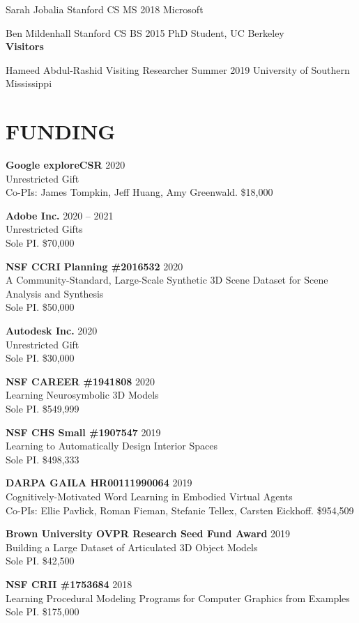 \documentclass[line,margin]{res}
\begin{document}
\begin{resume}
\alumni
{Sarah Jobalia}
{Stanford CS MS}
{2018}
{Microsoft}

\alumni
{Ben Mildenhall}
{Stanford CS BS}
{2015}
{PhD Student, UC Berkeley}
\\


\textbf{Visitors}

\visitor
{Hameed Abdul-Rashid}
{Visiting Researcher}
{Summer 2019}
{University of Southern Mississippi}


\section{FUNDING}

\newcommand{\funding}[5] {
	\textbf{#1} \hfill #5\\
	#2 \\
	#3. #4
}

\funding
{Google exploreCSR}
{Unrestricted Gift}
{Co-PIs: James Tompkin, Jeff Huang, Amy Greenwald}
{\$18,000}
{2020}

\funding
{Adobe Inc.}
{Unrestricted Gifts}
{Sole PI}
{\$70,000}
{2020 -- 2021}

\funding
{NSF CCRI Planning \#2016532}
{A Community-Standard, Large-Scale Synthetic 3D Scene Dataset for Scene Analysis and Synthesis}
{Sole PI}
{\$50,000}
{2020}

\funding
{Autodesk Inc.}
{Unrestricted Gift}
{Sole PI}
{\$30,000}
{2020}

\funding
{NSF CAREER \#1941808}
{Learning Neurosymbolic 3D Models}
{Sole PI}
{\$549,999}
{2020}

\funding
{NSF CHS Small \#1907547}
{Learning to Automatically Design Interior Spaces}
{Sole PI}
{\$498,333}
{2019}

\funding
{DARPA GAILA HR00111990064}
{Cognitively-Motivated Word Learning in Embodied Virtual Agents}
{Co-PIs: Ellie Pavlick, Roman Fieman, Stefanie Tellex, Carsten Eickhoff}
{\$954,509}
{2019}

\funding
{Brown University OVPR Research Seed Fund Award}
{Building a Large Dataset of Articulated 3D Object Models}
{Sole PI}
{\$42,500}
{2019}

\funding
{NSF CRII \#1753684}
{Learning Procedural Modeling Programs for Computer Graphics from Examples}
{Sole PI}
{\$175,000}
{2018}



\end{resume}
\end{document}
